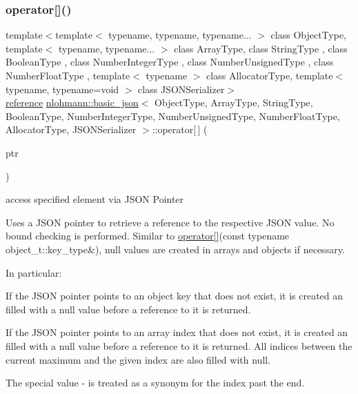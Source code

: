 \subsubsection{\texorpdfstring{operator[]()}{operator[]()}\hspace{0.1cm}{\footnotesize\ttfamily [7/8]}}
{\footnotesize\ttfamily template$<$template$<$ typename, typename, typename... $>$ class Object\+Type, template$<$ typename, typename... $>$ class Array\+Type, class String\+Type , class Boolean\+Type , class Number\+Integer\+Type , class Number\+Unsigned\+Type , class Number\+Float\+Type , template$<$ typename $>$ class Allocator\+Type, template$<$ typename, typename=void $>$ class J\+S\+O\+N\+Serializer$>$ \\
\hyperlink{classnlohmann_1_1basic__json_ac6a5eddd156c776ac75ff54cfe54a5bc}{reference} \hyperlink{classnlohmann_1_1basic__json}{nlohmann\+::basic\+\_\+json}$<$ Object\+Type, Array\+Type, String\+Type, Boolean\+Type, Number\+Integer\+Type, Number\+Unsigned\+Type, Number\+Float\+Type, Allocator\+Type, J\+S\+O\+N\+Serializer $>$\+::operator\mbox{[}$\,$\mbox{]} (\begin{DoxyParamCaption}\item[{const \hyperlink{classnlohmann_1_1basic__json_a6886a5001f5b449ad316101a311ce536}{json\+\_\+pointer} \&}]{ptr }\end{DoxyParamCaption})\hspace{0.3cm}{\ttfamily [inline]}}



access specified element via J\+S\+ON Pointer 

Uses a J\+S\+ON pointer to retrieve a reference to the respective J\+S\+ON value. No bound checking is performed. Similar to \hyperlink{classnlohmann_1_1basic__json_ac871e3b03fb2eeca9a8de4db2bea760f}{operator\mbox{[}\mbox{]}}(const typename object\+\_\+t\+::key\+\_\+type\&), {\ttfamily null} values are created in arrays and objects if necessary.

In particular\+:
\begin{DoxyItemize}
\item If the J\+S\+ON pointer points to an object key that does not exist, it is created an filled with a {\ttfamily null} value before a reference to it is returned.
\item If the J\+S\+ON pointer points to an array index that does not exist, it is created an filled with a {\ttfamily null} value before a reference to it is returned. All indices between the current maximum and the given index are also filled with {\ttfamily null}.
\item The special value {\ttfamily -\/} is treated as a synonym for the index past the end.
\end{DoxyItemize}


